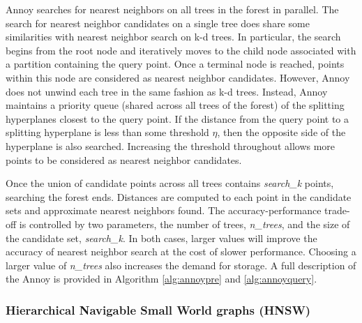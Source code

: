 \documentclass[12pt]{article}
\begin{document}
Annoy searches for nearest neighbors on all trees in the forest in parallel. The search for nearest neighbor candidates on a single tree does share some similarities with nearest neighbor search on k-d trees. In particular, the search begins from the root node and iteratively moves to the child node associated with a partition containing the query point. Once a terminal node is reached, points within this node are considered as nearest neighbor candidates. However, Annoy does not unwind each tree in the same fashion as k-d trees. Instead, Annoy maintains a priority queue (shared across all trees of the forest) of the splitting hyperplanes closest to the query point. If the distance from the query point to a splitting hyperplane is less than some threshold \(\eta\), then the opposite side of the hyperplane is also searched. Increasing the threshold throughout allows more points to be considered as nearest neighbor candidates.

Once the union of candidate points across all trees contains \textit{search\_k} points, searching the forest ends. Distances are computed to each point in the candidate sets and approximate nearest neighbors found. The accuracy-performance trade-off is controlled by two parameters, the number of trees, \textit{n\_trees}, and the size of the candidate set, \textit{search\_k}. In both cases, larger values will improve the accuracy of nearest neighbor search at the cost of slower performance. Choosing a larger value of \textit{n\_trees} also increases the demand for storage. A full description of the Annoy is provided in Algorithm \ref{alg:annoypre} and \ref{alg:annoyquery}.

\hypertarget{hierarchical-navigable-small-world-graphs-hnsw}{%
\subsubsection*{Hierarchical Navigable Small World graphs (HNSW)}\label{hierarchical-navigable-small-world-graphs-hnsw}}
\end{document}
